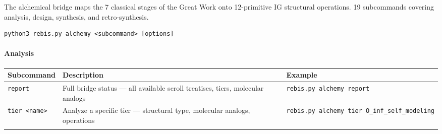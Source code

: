 \documentclass[12pt,a4paper]{article}
\begin{document}
The alchemical bridge maps the 7 classical stages of the Great Work onto
12-primitive IG structural operations. 19 subcommands covering analysis,
design, synthesis, and retro-synthesis.

\begin{verbatim}
python3 rebis.py alchemy <subcommand> [options]
\end{verbatim}

\hypertarget{analysis}{%
\paragraph{Analysis}\label{analysis}}

\begin{longtable}[]{@{}lll@{}}
\toprule
\begin{minipage}[b]{0.32\columnwidth}\raggedright
Subcommand\strut
\end{minipage} & \begin{minipage}[b]{0.35\columnwidth}\raggedright
Description\strut
\end{minipage} & \begin{minipage}[b]{0.24\columnwidth}\raggedright
Example\strut
\end{minipage}\tabularnewline
\midrule
\endhead
\begin{minipage}[t]{0.32\columnwidth}\raggedright
\texttt{report}\strut
\end{minipage} & \begin{minipage}[t]{0.35\columnwidth}\raggedright
Full bridge status --- all available scroll treatises, tiers, molecular
analogs\strut
\end{minipage} & \begin{minipage}[t]{0.24\columnwidth}\raggedright
\texttt{rebis.py\ alchemy\ report}\strut
\end{minipage}\tabularnewline
\begin{minipage}[t]{0.32\columnwidth}\raggedright
\texttt{tier\ \textless{}name\textgreater{}}\strut
\end{minipage} & \begin{minipage}[t]{0.35\columnwidth}\raggedright
Analyze a specific tier --- structural type, molecular analogs,
operations\strut
\end{minipage} & \begin{minipage}[t]{0.24\columnwidth}\raggedright
\texttt{rebis.py\ alchemy\ tier\ O\_inf\_self\_modeling}\strut
\end{minipage}\tabularnewline
\begin{minipage}[t]{0.32\columnwidth}\raggedright

\end{minipage}
\end{longtable}
\end{document}
